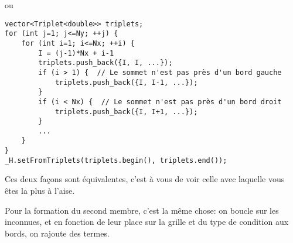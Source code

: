 \documentclass[11pt]{article}
\begin{document}
ou

\begin{Verbatim}
vector<Triplet<double>> triplets;
for (int j=1; j<=Ny; ++j) {
    for (int i=1; i<=Nx; ++i) {
        I = (j-1)*Nx + i-1
        triplets.push_back({I, I, ...});
        if (i > 1) {  // Le sommet n'est pas près d'un bord gauche
            triplets.push_back({I, I-1, ...});
        }
        if (i < Nx) {  // Le sommet n'est pas près d'un bord droit
            triplets.push_back({I, I+1, ...});
        } 
        ...
    }
}
_H.setFromTriplets(triplets.begin(), triplets.end());
\end{Verbatim}

Ces deux façons sont équivalentes, c'est à vous de voir celle avec laquelle vous êtes la plus à l'aise.

Pour la formation du second membre, c'est la même chose: on boucle sur les inconnues, et en fonction de leur place sur la grille et du type de condition aux bords, on rajoute des termes.
\end{document}
